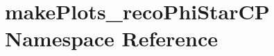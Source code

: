 \hypertarget{namespacemakePlots__recoPhiStarCP}{
\section{makePlots\_\-recoPhiStarCP Namespace Reference}
\label{namespacemakePlots__recoPhiStarCP}
}
